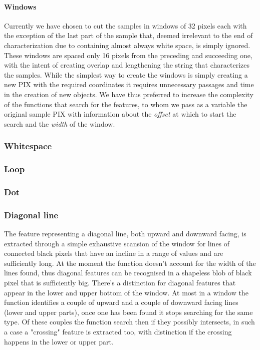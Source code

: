 \documentclass[a4paper,12pt]{article}
\begin{document}
\paragraph{Windows}
Currently we have chosen to cut the samples in windows of 32 pixels each with the exception of the last part of the sample that, deemed irrelevant to the end of characterization due to containing almost always white space, is simply ignored.
These windows are spaced only 16 pixels from the preceding and succeeding one, with the intent of creating overlap and lengthening the string that characterizes the samples.
While the simplest way to create the windows is simply creating a new PIX with the required coordinates it requires unnecessary passages and time in the creation of new objects. We have thus preferred to increase the complexity of the functions that search for the features, to whom we pass as a variable the original sample PIX with information about the \textit{offset} at which to start the search and the \textit{width} of the window.


\subsubsection{Whitespace}  

\subsubsection{Loop}

\subsubsection{Dot}

\subsubsection{Diagonal line}
The feature representing a diagonal line, both upward and downward facing, is extracted through a simple exhaustive scansion of the window for lines of connected black pixels that have an incline in a range of values and are sufficiently long.
At the moment the function doesn't account for the width of the lines found, thus diagonal features can be recognised in a shapeless blob of black pixel that is sufficiently big.    
There's a distinction for diagonal features that appear in the lower and upper bottom of the window.
At most in a window the function identifies a couple of upward and a couple of downward facing lines (lower and upper parts), once one has been found it stops searching for the same type.
Of these couples the function search %
 then if they possibly intersects, in such a case a "crossing" feature is extracted too, with distinction if the crossing happens in the lower or upper part. 
\end{document}
